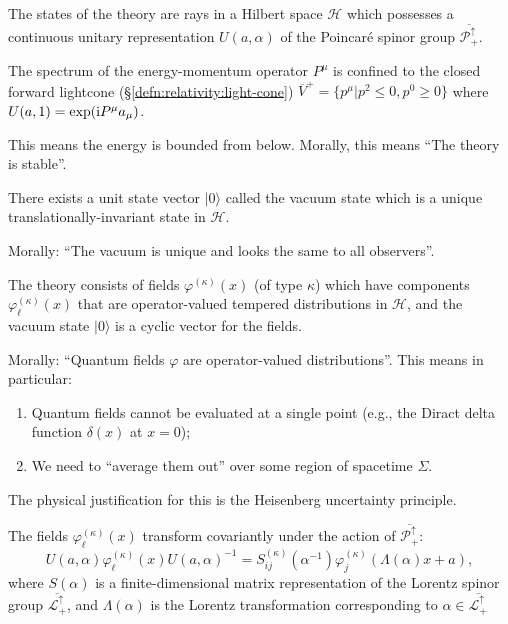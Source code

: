 \begin{axiom}
The states of the theory are rays in a Hilbert space $\mathcal{H}$ which
possesses a continuous unitary representation $U(a,\alpha)$ of the
Poincar\'e spinor group $\overline{\mathscr{P}^{\uparrow}_{+}}$.
\end{axiom}

\begin{axiom}
The spectrum of the energy-momentum operator $P^{\mu}$ is confined to
the closed forward lightcone (\S\ref{defn:relativity:light-cone})
$\overline{V}^{+}=\{p^{\mu}|p^{2}\leq0,p^{0}\geq0\}$
where $U(a,1)=\exp(\mathrm{i} P^{\mu}a_{\mu})$.
\end{axiom}

\begin{remark}
This means the energy is bounded from below. Morally, this means ``The
theory is stable''.
\end{remark}

\begin{axiom}
There exists a unit state vector $|0\rangle$ called the vacuum state
which is a unique translationally-invariant state in $\mathcal{H}$.
\end{axiom}

Morally: ``The vacuum is unique and looks the same to all observers''.

\begin{axiom}
The theory consists of fields $\varphi^{(\kappa)}(x)$ (of type $\kappa$)
which have components $\varphi^{(\kappa)}_{\ell}(x)$ that are
operator-valued tempered distributions in $\mathcal{H}$, and the vacuum
state $|0\rangle$ is a cyclic vector for the fields.
\end{axiom}

Morally: ``Quantum fields $\varphi$ are operator-valued distributions''.
This means in particular:
\begin{enumerate}
\item Quantum fields cannot be evaluated at a single point (e.g., the
  Diract delta function $\delta(x)$ at $x=0$);
\item We need to ``average them out'' over some region of spacetime $\Sigma$.
\end{enumerate}
The physical justification for this is the Heisenberg uncertainty principle.

\begin{axiom}
The fields $\varphi^{(\kappa)}_{\ell}(x)$ transform covariantly under
the action of $\overline{\mathscr{P}^{\uparrow}_{+}}$:
\begin{equation}
U(a,\alpha)\varphi^{(\kappa)}_{\ell}(x)U(a,\alpha)^{-1} = S_{ij}^{(\kappa)}(\alpha^{-1})\varphi_{j}^{(\kappa)}(\Lambda(\alpha)x+a),
\end{equation}
where $S(\alpha)$ is a finite-dimensional matrix representation of the
Lorentz spinor group $\overline{\mathscr{L}^{\uparrow}_{+}}$, and
$\Lambda(\alpha)$ is the Lorentz transformation corresponding to
$\alpha\in\overline{\mathscr{L}^{\uparrow}_{+}}$
\end{axiom}

